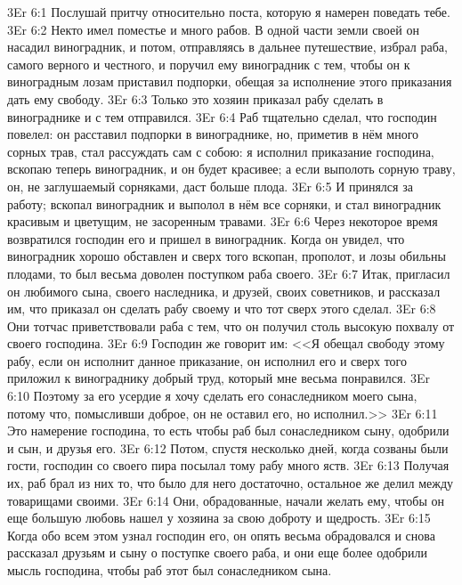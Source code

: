 \vs 3Er 6:1
Послушай притчу
относительно поста, которую я намерен поведать тебе.
\vs 3Er 6:2
Некто имел поместье и
много рабов. В одной части земли своей он насадил виноградник, и потом,
отправляясь в дальнее путешествие, избрал раба, самого верного и честного, и
поручил ему виноградник с тем, чтобы он к виноградным лозам приставил
подпорки, обещая за исполнение этого приказания дать ему свободу.
\vs 3Er 6:3
Только это хозяин приказал
рабу сделать в винограднике и с тем отправился.
\vs 3Er 6:4
Раб тщательно сделал, что
господин повелел: он расставил подпорки в винограднике, но, приметив в нём
много сорных трав, стал рассуждать сам с собою: я исполнил приказание
господина, вскопаю теперь виноградник, и он будет красивее; а если выполоть
сорную траву, он, не заглушаемый сорняками, даст больше плода.
\vs 3Er 6:5
И принялся за работу;
вскопал виноградник и выполол в нём все сорняки, и стал виноградник красивым и
цветущим, не засоренным травами.
\vs 3Er 6:6
Через некоторое время
возвратился господин его и пришел в виноградник. Когда он увидел, что
виноградник хорошо обставлен и сверх того вскопан, прополот, и лозы обильны
плодами, то был весьма доволен поступком раба своего.
\vs 3Er 6:7
Итак, пригласил он
любимого сына, своего наследника, и друзей, своих советников, и рассказал им,
что приказал он сделать рабу своему и что тот сверх этого сделал.
\vs 3Er 6:8
Они тотчас приветствовали
раба с тем, что он получил столь высокую похвалу от своего господина.
\vs 3Er 6:9
Господин же говорит им:
<<Я обещал свободу этому рабу, если он исполнит данное приказание, он исполнил его
и сверх того приложил к винограднику добрый труд, который мне весьма
понравился.
\vs 3Er 6:10
Поэтому за его усердие я
хочу сделать его сонаследником моего сына, потому что, помысливши доброе, он
не оставил его, но исполнил.>>
\vs 3Er 6:11
Это намерение господина,
то есть чтобы раб был сонаследником сыну, одобрили и сын, и друзья его.
\vs 3Er 6:12
Потом, спустя несколько
дней, когда созваны были гости, господин со своего пира посылал тому рабу
много яств.
\vs 3Er 6:13
Получая их, раб брал из
них то, что было для него достаточно, остальное же делил между товарищами
своими.
\vs 3Er 6:14
Они, обрадованные, начали
желать ему, чтобы он еще большую любовь нашел у хозяина за свою доброту и
щедрость.
\vs 3Er 6:15
Когда обо всем этом узнал
господин его, он опять весьма обрадовался и снова рассказал друзьям и сыну о
поступке своего раба, и они еще более одобрили мысль господина, чтобы раб этот
был сонаследником сына.

